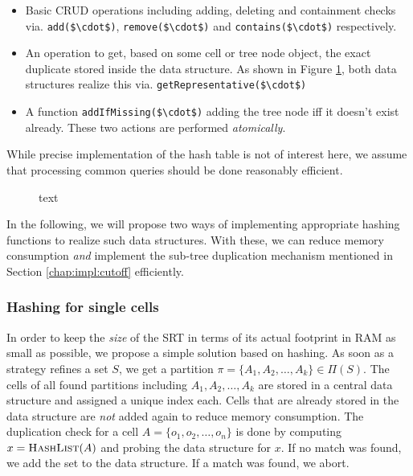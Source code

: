 		\begin{itemize}
			\item Basic \ac{CRUD} operations including adding, deleting and containment checks via. \lstinline[mathescape]|add($\cdot$)|, \lstinline[mathescape]|remove($\cdot$)| and \lstinline[mathescape]|contains($\cdot$)| respectively.
			\item An operation to get, based on some cell or tree node object, the exact duplicate stored inside the data structure. As shown in Figure \ref{fig:impl:hashing:datastruct}, both data structures realize this via. \lstinline[mathescape]|getRepresentative($\cdot$)|
			\item A function \lstinline[mathescape]|addIfMissing($\cdot$)| adding the tree node iff it doesn't exist already. These two actions are performed \textit{atomically}.
		\end{itemize}

		While precise implementation of the hash table is not of interest here, we assume that processing common queries should be done reasonably efficient.

		\begin{figure}[ht!]
			\centering
			
			\caption{text}
			\label{fig:impl:hashing:datastruct}
		\end{figure}

		In the following, we will propose two ways of implementing appropriate hashing functions to realize such data structures.
		With these, we can reduce memory consumption \textit{and} implement the sub-tree duplication mechanism mentioned in Section \ref{chap:impl:cutoff} efficiently.

		\clearpage

		\subsubsection{Hashing for single cells}

		In order to keep the \textit{size} of the \ac{SRT} in terms of its actual footprint in RAM as small as possible, we propose a simple solution based on hashing.
		As soon as a strategy refines a set $S$, we get a partition $\pi = \{ A_1, A_2, \ldots, A_k \}\in \Pi(S)$.
		The cells of all found partitions including $A_1, A_2, \ldots, A_k$ are stored in a central data structure and assigned a unique index each.
		Cells that are already stored in the data structure are \textit{not} added again to reduce memory consumption.
		The duplication check for a cell $A = \{ o_1, o_2, \ldots, o_n \}$ is done by computing $x = \Call{HashList}{A}$ and probing the data structure for $x$.
		If no match was found, we add the set to the data structure.
		If a match was found, we abort.

